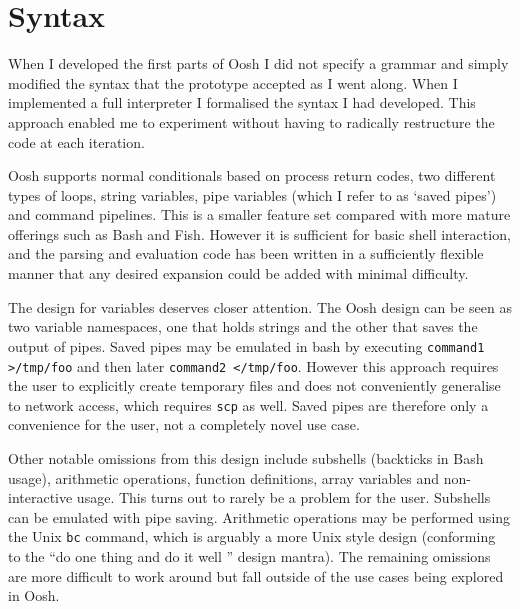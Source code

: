 \documentclass[12pt,twoside,notitlepage]{report}
\begin{document}
\section{Syntax}
When I developed the first parts of Oosh I did not specify a grammar and simply
modified the syntax that the prototype accepted as I went along. When I
implemented a full interpreter I formalised the syntax I had developed. This
approach enabled me to experiment without having to radically restructure the
code at each iteration.

Oosh supports normal conditionals based on process return codes, two
different types of loops, string variables, pipe variables (which I
refer to as `saved pipes') and command pipelines. This is a smaller
feature set compared with more mature offerings such as Bash and
Fish. However it is sufficient for basic shell interaction, and the
parsing and evaluation code has been written in a sufficiently
flexible manner that any desired expansion could be added with minimal
difficulty.

The design for variables deserves closer attention. The Oosh design
can be seen as two variable namespaces, one that holds strings and the
other that saves the output of pipes. Saved pipes may be emulated in
bash by executing {\tt command1 >/tmp/foo} and then later {\tt command2
  </tmp/foo}. However this approach requires the user to explicitly
create temporary files and does not conveniently generalise to network
access, which requires {\tt scp} as well. Saved pipes are therefore
only a convenience for the user, not a completely novel use case.

Other notable omissions from this design include subshells (backticks
in Bash usage), arithmetic operations, function definitions, array
variables and non-interactive usage. This turns out to rarely be a
problem for the user. Subshells can be emulated with pipe
saving. Arithmetic operations may be performed using the Unix {\tt bc}
command, which is arguably a more Unix style design (conforming to the
``do one thing and do it well '' design mantra). The remaining
omissions are more difficult to work around but fall outside of the
use cases being explored in Oosh.
\end{document}

